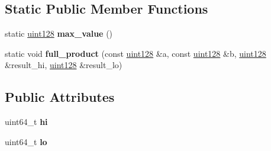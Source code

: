 \subsection*{Static Public Member Functions}
\begin{DoxyCompactItemize}
\item 
\mbox{\label{classfc_1_1uint128_a2632bf02871ad58231ebce379c949215}} 
static \mbox{\hyperlink{classfc_1_1uint128}{uint128}} {\bfseries max\+\_\+value} ()
\item 
\mbox{\label{classfc_1_1uint128_a7e8b11afaf3f0703880e0f906252919c}} 
static void {\bfseries full\+\_\+product} (const \mbox{\hyperlink{classfc_1_1uint128}{uint128}} \&a, const \mbox{\hyperlink{classfc_1_1uint128}{uint128}} \&b, \mbox{\hyperlink{classfc_1_1uint128}{uint128}} \&result\+\_\+hi, \mbox{\hyperlink{classfc_1_1uint128}{uint128}} \&result\+\_\+lo)
\end{DoxyCompactItemize}
\subsection*{Public Attributes}
\begin{DoxyCompactItemize}
\item 
\mbox{\label{classfc_1_1uint128_ae6029055eec4021b28b1b751f0787faa}} 
uint64\+\_\+t {\bfseries hi}
\item 
\mbox{\label{classfc_1_1uint128_ab492d9040d8a8a337c1532ee2b598746}} 
uint64\+\_\+t {\bfseries lo}
\end{DoxyCompactItemize}
